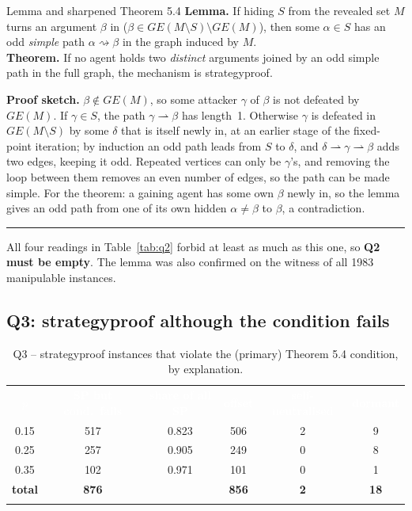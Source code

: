 \documentclass[10pt,a4paper]{article}
\newcommand{\thd}[1]{\textcolor{white}{\sffamily\bfseries #1}}
\newcommand{\tabend}{\arrayrulecolor{brand}\specialrule{0.8pt}{0pt}{0pt}\arrayrulecolor{black}}
\newcommand{\att}{\rightharpoonup}          %
\newcommand{\GE}{\mathit{GE}}
\newcommand{\qedbox}{{\color{brand}\rule{0.55em}{0.55em}}}
\begin{document}
\begin{defbox}{Lemma and sharpened Theorem 5.4}
\textbf{Lemma.} If hiding $S$ from the revealed set $M$ turns an argument $\beta$ \textsf{in}
($\beta\in\GE(M\setminus S)\setminus\GE(M)$), then some $\alpha\in S$ has an odd \emph{simple} path $\alpha\rightsquigarrow\beta$ in the
graph induced by $M$.\\[2pt]
\textbf{Theorem.} If no agent holds two \emph{distinct} arguments joined by an odd simple path in the full graph, the
mechanism is strategyproof.
\end{defbox}

\textbf{Proof sketch.} $\beta\notin\GE(M)$, so some attacker $\gamma$ of $\beta$ is not defeated by $\GE(M)$. If $\gamma\in S$, the path
$\gamma\att\beta$ has length~1. Otherwise $\gamma$ is defeated in $\GE(M\setminus S)$ by some $\delta$ that is itself newly \textsf{in}, at
an earlier stage of the fixed-point iteration; by induction an odd path leads from $S$ to $\delta$, and $\delta\att\gamma\att\beta$ adds two
edges, keeping it odd. Repeated vertices can only be $\gamma$'s, and removing the loop between them removes an even number of edges,
so the path can be made simple. For the theorem: a gaining agent has some own $\beta$ newly \textsf{in}, so the lemma gives an odd
path from one of its own hidden $\alpha\ne\beta$ to $\beta$, a contradiction.~\qedbox

All four readings in Table~\ref{tab:q2} forbid at least as much as this one, so \textbf{Q2 must be empty}. The lemma was also
confirmed on the witness of all 1983 manipulable instances.

\subsection{Q3: strategyproof although the condition fails}\label{sec:q3}

\begin{table}[H]\centering
\caption{Q3 -- strategyproof instances that violate the (primary) Theorem 5.4 condition, by explanation.}\label{tab:q3}
\small
\begin{tabular}{c c c c c c}
\rowcolor{brand}\thd{$p$} & \thd{SP but cond.\ fails} & \thd{share of all SP} & \thd{offset} & \thd{self-neutralised} & \thd{dormant}\\
\rowcolor{white} 0.15 & 517 & 0.823 & 506 & 2 & 9\\
\rowcolor{rowalt} 0.25 & 257 & 0.905 & 249 & 0 & 8\\
\rowcolor{white} 0.35 & 102 & 0.971 & 101 & 0 & 1\\
\rowcolor{ennbg} \textbf{total} & \textbf{876} & & \textbf{856} & \textbf{2} & \textbf{18}\\
\tabend
\end{tabular}
\end{table}
\end{document}
